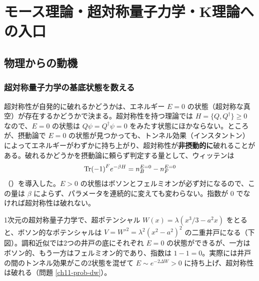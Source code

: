 \chapter{モース理論・超対称量子力学・K理論への入口}\label{ch:11}

\section{物理からの動機}

\subsection*{超対称量子力学の基底状態を数える}
超対称性が自発的に破れるかどうかは、エネルギー $E=0$ の状態（超対称な真空）が存在するかどうかで決まる。超対称性を持つ理論では $H=\{Q,Q^\dagger\}\ge0$ なので、$E=0$ の状態は $Q\psi=Q^\dagger\psi=0$ をみたす状態にほかならない。ところが、摂動論で $E=0$ の状態が見つかっても、トンネル効果（インスタントン）によってエネルギーがわずかに持ち上がり、超対称性が\textbf{非摂動的に}破れることがある。破れるかどうかを摂動論に頼らず判定する量として、ウィッテンは
\[
\Tr(-1)^F e^{-\beta H}=n_B^{E=0}-n_F^{E=0}
\]
（）を導入した。$E>0$ の状態はボソンとフェルミオンが必ず対になるので、この量は $\beta$ によらず、パラメータを連続的に変えても変わらない。指数が $0$ でなければ超対称性は破れない。

1次元の超対称量子力学で、超ポテンシャル $W(x)=\lambda(x^3/3-a^2x)$ をとると、ボソン的なポテンシャルは $V=W'^2=\lambda^2(x^2-a^2)^2$ の二重井戸になる（下図）。調和近似では2つの井戸の底にそれぞれ $E=0$ の状態ができるが、一方はボソン的、もう一方はフェルミオン的であり、指数は $1-1=0$。実際には井戸の間のトンネル効果がこの2状態を混ぜて $E\sim e^{-2\Delta W}>0$ に持ち上げ、超対称性は破れる（問題 \ref{ch11-prob-dw}）。

